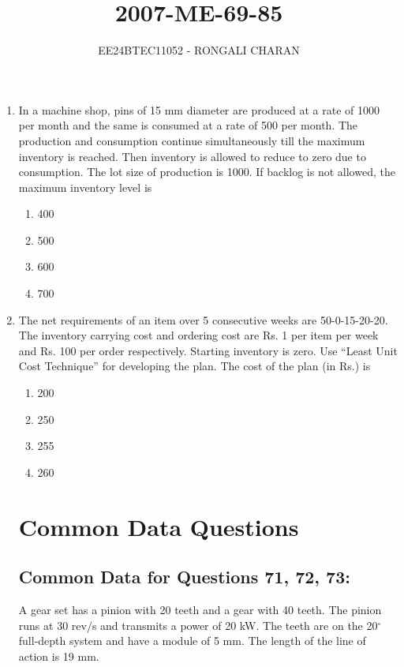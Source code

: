 \documentclass[journal,12pt,onecolumn]{IEEEtran}
\theoremstyle{remark}
\begin{document}

\vspace{3cm}

\title{\textbf{2007-ME-69-85}}
\author{EE24BTEC11052 - RONGALI CHARAN}
\maketitle
\bigskip

\renewcommand{\thefigure}{\theenumi}
\renewcommand{\thetable}{\theenumi}
\setlength{\columnsep}{2.5em}
\begin{enumerate}
\item In a machine shop, pins of 15 mm diameter are produced at a rate of 1000 per month and the same is consumed at a rate of 500 per month. The production and consumption continue simultaneously till the maximum inventory is reached. Then inventory is allowed to reduce to zero due to consumption. The lot size of production is 1000. If backlog is not allowed, the maximum inventory level is  
\begin{enumerate}
    \item 400
    \item 500
    \item 600
    \item 700
\end{enumerate}

\item The net requirements of an item over 5 consecutive weeks are 50-0-15-20-20. The inventory carrying cost and ordering cost are Rs. 1 per item per week and Rs. 100 per order respectively. Starting inventory is zero. Use ``Least Unit Cost Technique'' for developing the plan. The cost of the plan (in Rs.) is  
\begin{enumerate}
    \item 200
    \item 250
    \item 255
    \item 260
\end{enumerate}

\section*{Common Data Questions}

\subsection{Common Data for Questions 71, 72, 73:}  
A gear set has a pinion with 20 teeth and a gear with 40 teeth. The pinion runs at 30 rev/s and transmits a power of 20 kW. The teeth are on the 20$^\circ$ full-depth system and have a module of 5 mm. The length of the line of action is 19 mm.


\end{enumerate}
\end{document}
